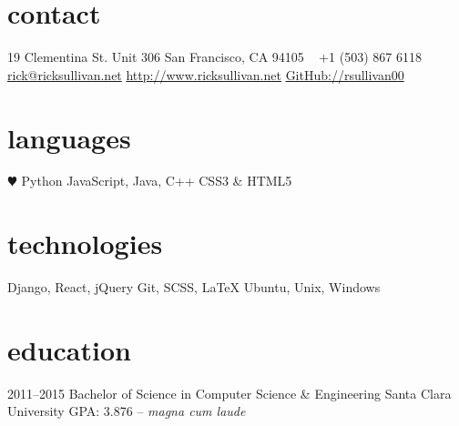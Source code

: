 \documentclass[]{friggeri-cv} %
\begin{document}


\begin{aside} %
\section{contact}
19 Clementina St.
Unit 306
San Francisco, CA 94105
~
+1 (503) 867 6118
~
\href{mailto:rick@ricksullivan.net}{rick@ricksullivan.net}
\href{http://www.ricksullivan.net}{http://www.ricksullivan.net}
\href{http://github.com/rsullivan00}{GitHub://rsullivan00}
%
\section{languages}
{\color{red} $\varheartsuit$} Python
JavaScript, Java, C++
CSS3 \& HTML5
%
\section{technologies}
Django, React, jQuery
Git, SCSS, LaTeX
Ubuntu, Unix, Windows
\end{aside}

\section{education}

\begin{entrylist}

\entry
{2011--2015}
{Bachelor of Science {\normalfont in Computer Science \& Engineering}}
{Santa Clara University}
{GPA: 3.876 -- \emph{magna cum laude}}



\end{entrylist}

\end{document}
